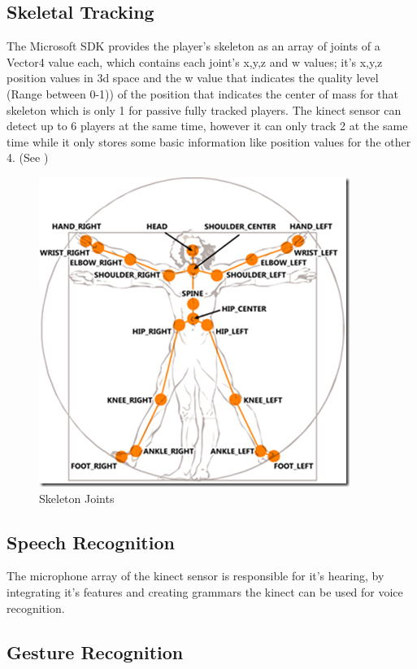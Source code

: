 \subsection{Skeletal Tracking}

The Microsoft SDK provides the player's skeleton as an array of joints of a Vector4 value each, which contains each joint's x,y,z and w values; it's x,y,z position values in 3d space and the w value that indicates  the quality level (Range between 0-1)) of the position that indicates the center of mass for that skeleton which is only 1 for passive fully tracked players. The kinect sensor can detect up to 6 players at the same time, however it can only track 2 at the same time while it only stores some basic information like position values for the other 4.
(See )
\begin{figure}[btp]
  \centering
  \includegraphics[width=0.5\linewidth]{SkeletonJoints}
  \caption{Skeleton Joints}
  \label{fig:skeletonjoints}
\end{figure}



\subsection{Speech Recognition}

The microphone array of the kinect sensor is responsible for it's hearing, by integrating it's features and creating grammars the kinect can be used for voice recognition.

\subsection{Gesture Recognition}

